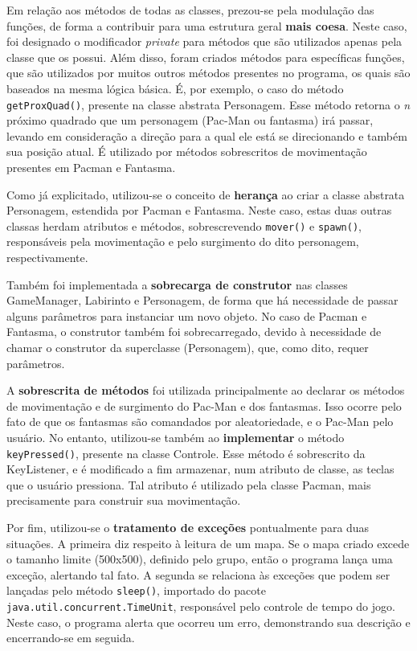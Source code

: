\documentclass[]{article}
\begin{document}
Em relação aos métodos de todas as classes, prezou-se pela modulação das funções, de forma a contribuir para uma estrutura geral \textbf{mais coesa}. Neste caso, foi designado o modificador \textsl{private} para métodos que são utilizados apenas pela classe que os possui. Além disso, foram criados métodos para específicas funções, que são utilizados por muitos outros métodos presentes no programa, os quais são baseados na mesma lógica básica. É, por exemplo, o caso do método \texttt{getProxQuad()}, presente na classe abstrata Personagem. Esse método retorna o \textsl{n} próximo quadrado que um personagem (Pac-Man ou fantasma) irá passar, levando em consideração a direção para a qual ele está se direcionando e também sua posição atual. É utilizado por métodos sobrescritos de movimentação presentes em Pacman e Fantasma.

Como já explicitado, utilizou-se o conceito de \textbf{herança} ao criar a classe abstrata Personagem, estendida por Pacman e Fantasma. Neste caso, estas duas outras classas herdam atributos e métodos, sobrescrevendo \texttt{mover()} e \texttt{spawn()}, responsáveis pela movimentação e pelo surgimento do dito personagem, respectivamente.

Também foi implementada a \textbf{sobrecarga de construtor} nas classes GameManager, Labirinto e Personagem, de forma que há necessidade de passar alguns parâmetros para instanciar um novo objeto. No caso de Pacman e Fantasma, o construtor também foi sobrecarregado, devido à necessidade de chamar o construtor da superclasse (Personagem), que, como dito, requer parâmetros.

A \textbf{sobrescrita de métodos} foi utilizada principalmente ao declarar os métodos de movimentação e de surgimento do Pac-Man e dos fantasmas. Isso ocorre pelo fato de que os fantasmas são comandados por aleatoriedade, e o Pac-Man pelo usuário. No entanto, utilizou-se também ao \textbf{implementar} o método \texttt{keyPressed()}, presente na classe Controle. Esse método é sobrescrito da  KeyListener, e é modificado a fim armazenar, num atributo de classe, as teclas que o usuário pressiona. Tal atributo é utilizado pela classe Pacman, mais precisamente para construir sua movimentação.

Por fim, utilizou-se o \textbf{tratamento de exceções} pontualmente para duas situações. A primeira diz respeito à leitura de um mapa. Se o mapa criado excede o tamanho limite (500x500), definido pelo grupo, então o programa lança uma exceção, alertando tal fato. A segunda se relaciona às exceções que podem ser lançadas pelo método \texttt{sleep()}, importado do pacote \texttt{java.util.concurrent.TimeUnit}, responsável pelo controle de tempo do jogo. Neste caso, o programa alerta que ocorreu um erro, demonstrando sua descrição e encerrando-se em seguida.
\end{document}
